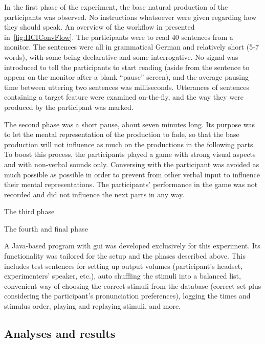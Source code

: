 In the first phase of the experiment, the base natural production of the participants was observed.
No instructions whatsoever were given regarding how they should speak.
An overview of the workflow in presented in~\autoref{fig:HCIConvFlow}.
The participants were to read 40 sentences from a monitor.
The sentences were all in grammatical German and relatively short (5-7 words), with some being declarative and some interrogative.
No signal was introduced to tell the participants to start reading (aside from the sentence to appear on the monitor after a blank \enquote{pause} screen), and the average pausing time between uttering two sentences was
milliseconds.
Utterances of sentences containing a target feature were examined on-the-fly, and the way they were produced by the participant was marked.

The second phase was a short pause, about seven minutes long.
Its purpose was to let the mental representation of the production to fade, so that the base production will not influence as much on the productions in the following parts.
To boost this process, the participants played a game with strong visual aspects and with non-verbal sounds only.
Conversing with the participant was avoided as much possible as possible in order to prevent from other verbal input to influence their mental representations.
The participants' performance in the game was not recorded and did not influence the next parts in any way.

The third phase

The fourth and final phase

A Java-based program with \ac{gui} was developed exclusively for this experiment.
Its functionality was tailored for the setup and the phases described above.
This includes test sentences for setting up output volumes (participant's headset, experimenters' speaker, etc.), auto shuffling the stimuli into a balanced list, convenient way of choosing the correct stimuli from the database (correct set plus considering the participant's pronunciation preferences), logging the times and stimulus order, playing and replaying stimuli, and more.

\subsection{Analyses and results}
\label{subsec:results_hci}


